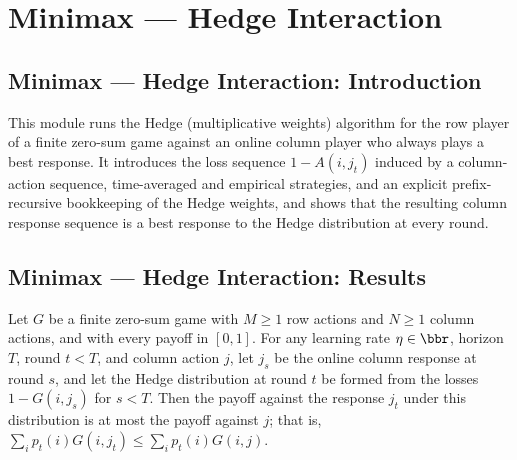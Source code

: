 \section{Minimax --- Hedge Interaction}
\subsection*{Minimax --- Hedge Interaction: Introduction}

This module runs the Hedge (multiplicative weights) algorithm for the row player
of a finite zero-sum game against an online column player who always plays a
best response.  It introduces the loss sequence $1 - A(i, j_t)$ induced by a
column-action sequence, time-averaged and empirical strategies, and an explicit
prefix-recursive bookkeeping of the Hedge weights, and shows that the resulting
column response sequence is a best response to the Hedge distribution at every
round.

\subsection*{Minimax --- Hedge Interaction: Results}

\begin{lemma}
\label{hedgeResponseNat_isBestResponse}
\leanok
{}
Let $G$ be a finite zero-sum game with $M\ge1$ row actions and $N\ge1$ column actions,
and with every payoff in $[0,1]$. For any learning rate $\eta\in\bbr$, horizon $T$,
round $t<T$, and column action $j$, let $j_s$ be the online column response at round
$s$, and let the Hedge distribution at round $t$ be formed from the losses $1-G(i,j_s)$
for $s<T$. Then the payoff against the response $j_t$ under this distribution is at most
the payoff against $j$; that is, $\sum_i p_t(i)G(i,j_t)\le\sum_i p_t(i)G(i,j)$.
\end{lemma}
